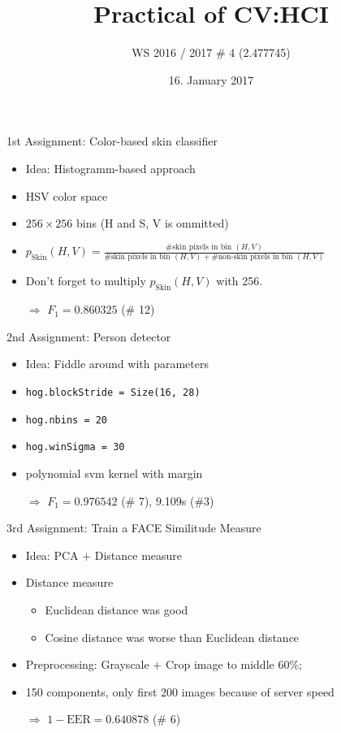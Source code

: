 \documentclass{beamer}
\title{Practical of CV:HCI}
\subtitle{WS 2016 / 2017 \# 4 (2.477745)}
\author[Martin\,Thoma \& Bettina\,Weller\& Yang\,Zhang]
{%
  \texorpdfstring{
    \begin{columns}%
      \column{.30\linewidth}
      \centering
      Martin Thoma\      \href{mailto:info@martin-thoma.de}{info@martin-thoma.de}
      \column{.30\linewidth}
      \centering
      Bettina Weller\\    \href{bettinaweller@web.de}{bettinaweller@web.de}
      \column{.30\linewidth}
      \centering
      Yang Zhang\\    \href{yang.zhang@student.kit.edu}{yang.zhang@student.kit.edu}
    \end{columns}
  }
  {John Doe \& Jane Doe}
}
\date{16. January 2017}
\begin{document}
\frame{\titlepage}

\begin{frame}{1st Assignment: Color-based skin classifier}
    \begin{itemize}
        \item Idea: Histogramm-based approach
        \item HSV color space
        \item $256 \times 256$ bins (H and S, V is ommitted)
        \item $p_\text{Skin}(H, V) = \frac{\text{\# skin pixels in bin } (H, V)}{\text{\# skin pixels in bin } (H, V) + \text{\# non-skin pixels in bin } (H, V)}$
        \item Don't forget to multiply $p_\text{Skin}(H, V)$ with 256.
        \item[$\Rightarrow$] $F_1 = 0.860325$ (\# 12)
    \end{itemize}
\end{frame}

\begin{frame}{2nd Assignment: Person detector}
    \begin{itemize}
        \item Idea: Fiddle around with parameters
        \item \texttt{hog.blockStride = Size(16, 28)}
        \item \texttt{hog.nbins = 20}
        \item \texttt{hog.winSigma = 30}
        \item polynomial svm kernel with margin
        \item[$\Rightarrow$] $F_1 = 0.976542$ (\# 7), 9.109s (\#3)
    \end{itemize}
\end{frame}

\begin{frame}{3rd Assignment: Train a FACE Similitude Measure}
    \begin{itemize}
        \item Idea: PCA + Distance measure
        \item Distance measure
        \begin{itemize}
            \item Euclidean distance was good
            \item Cosine distance was worse than Euclidean distance
        \end{itemize}
        \item Preprocessing: Grayscale + Crop image to middle 60\%; 
        \item 150 components, only first 200 images because of server speed
        \item[$\Rightarrow$] $1- \text{EER} = 0.640878$ (\# 6)
    \end{itemize}
\end{frame}
\end{document}
